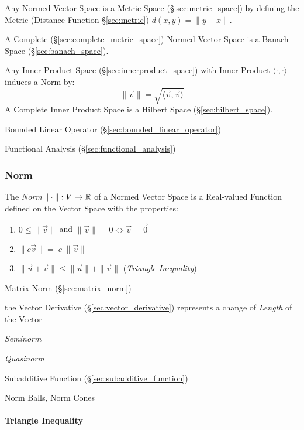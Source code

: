 Any Normed Vector Space is a Metric Space (\S\ref{sec:metric_space}) by
defining the Metric (Distance Function \S\ref{sec:metric}) $d(x,y) = \|y-x\|$.

A Complete (\S\ref{sec:complete_metric_space}) Normed Vector Space is a Banach
Space (\S\ref{sec:banach_space}).

Any Inner Product Space (\S\ref{sec:innerproduct_space}) with Inner Product
$\langle{\cdot,\cdot}\rangle$ induces a Norm by:
\[
  \|\vec{v}\| = \sqrt{\langle{\vec{v},\vec{v}}\rangle}
\]
A Complete Inner Product Space is a Hilbert Space (\S\ref{sec:hilbert_space}).

Bounded Linear Operator (\S\ref{sec:bounded_linear_operator})

Functional Analysis (\S\ref{sec:functional_analysis})



\subsubsection{Norm}\label{sec:norm}

The \emph{Norm} $\|\cdot\| : V \rightarrow \mathbb{R}$ of a Normed Vector Space is
a Real-valued Function defined on the Vector Space with the properties:
\begin{enumerate}
  \item $0 \leq \|\vec{v}\|$ and
    $\|\vec{v}\| = 0 \Leftrightarrow \vec{v} = \vec{0}$
  \item $\|c\vec{v}\| = |c|\|\vec{v}\|$
  \item $\|\vec{u} + \vec{v}\| \leq \|\vec{u}\| + \|\vec{v}\|$ (\emph{Triangle
    Inequality})
\end{enumerate}

\fist Matrix Norm (\S\ref{sec:matrix_norm})

the Vector Derivative (\S\ref{sec:vector_derivative}) represents a change of
\emph{Length} of the Vector

\emph{Seminorm}

\emph{Quasinorm}

Subadditive Function (\S\ref{sec:subadditive_function})

Norm Balls, Norm Cones



\paragraph{Triangle Inequality}\label{sec:triangle_inequality}\hfill

